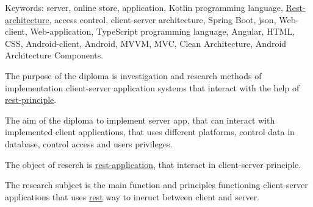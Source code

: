 Keywords: server, online store, application, Kotlin programming language, \hyperlink{gloss:rest}{Rest-architecture}, access control, client-server architecture, Spring Boot, json, Web-client, Web-application, TypeScript programming language, Angular, HTML, CSS, Android-client, Android, MVVM, MVC, Clean Architecture, Android Architecture Components.

The purpose of the diploma is investigation and research methods of implementation client-server application systems that interact with the help of \hyperlink{gloss:rest}{rest-principle}.

The aim of the diploma to implement server app, that can interact with implemented client applications, that uses different platforms, control data in database, control access and users privileges.

The object of reserch is \hyperlink{gloss:rest}{rest-application}, that interact in client-server principle.

The research subject is the main function and principles functioning client-server applications that uses \hyperlink{gloss:rest}{rest} way to ineruct between client and server.